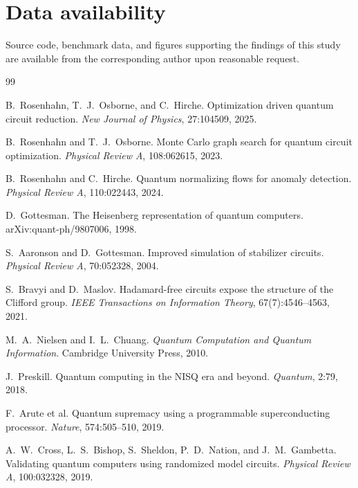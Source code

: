\documentclass[11pt]{article}
\begin{document}
\section*{Data availability}
Source code, benchmark data, and figures supporting the findings of this
study are available from the corresponding author upon reasonable
request.


\begin{thebibliography}{99}

B.~Rosenhahn, T.~J.~Osborne, and C.~Hirche.
\newblock Optimization driven quantum circuit reduction.
\newblock \emph{New Journal of Physics}, 27:104509, 2025.

B.~Rosenhahn and T.~J.~Osborne.
\newblock Monte Carlo graph search for quantum circuit optimization.
\newblock \emph{Physical Review A}, 108:062615, 2023.

B.~Rosenhahn and C.~Hirche.
\newblock Quantum normalizing flows for anomaly detection.
\newblock \emph{Physical Review A}, 110:022443, 2024.

D.~Gottesman.
\newblock The Heisenberg representation of quantum computers.
\newblock arXiv:quant-ph/9807006, 1998.

S.~Aaronson and D.~Gottesman.
\newblock Improved simulation of stabilizer circuits.
\newblock \emph{Physical Review A}, 70:052328, 2004.

S.~Bravyi and D.~Maslov.
\newblock Hadamard-free circuits expose the structure of the Clifford
group.
\newblock \emph{IEEE Transactions on Information Theory}, 67(7):4546--4563,
2021.

M.~A.~Nielsen and I.~L.~Chuang.
\newblock \emph{Quantum Computation and Quantum Information}.
\newblock Cambridge University Press, 2010.

J.~Preskill.
\newblock Quantum computing in the NISQ era and beyond.
\newblock \emph{Quantum}, 2:79, 2018.

F.~Arute et al.
\newblock Quantum supremacy using a programmable superconducting processor.
\newblock \emph{Nature}, 574:505--510, 2019.

A.~W.~Cross, L.~S.~Bishop, S.~Sheldon, P.~D.~Nation, and J.~M.~Gambetta.
\newblock Validating quantum computers using randomized model circuits.
\newblock \emph{Physical Review A}, 100:032328, 2019.


\end{thebibliography}
\end{document}
